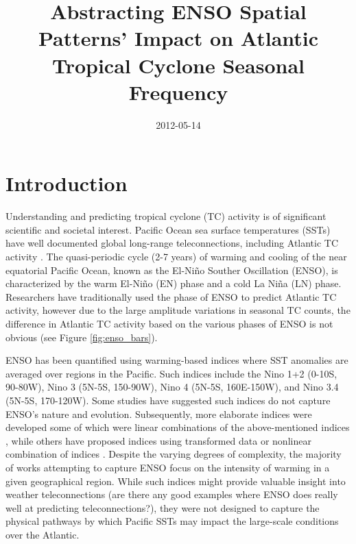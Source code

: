 \documentclass[]{article}
\title{Abstracting ENSO Spatial Patterns' Impact on Atlantic Tropical Cyclone Seasonal Frequency}
\author{  }
\date{2012-05-14}
\begin{document}
\ifpdf
{}
\else
{}
\fi

\maketitle


\begin{abstract}
\end{abstract}

\section{Introduction}
Understanding and predicting tropical cyclone (TC) activity is of significant scientific and societal interest. Pacific Ocean sea surface temperatures (SSTs) have well documented global long-range teleconnections, including Atlantic TC activity \cite{gray1984a, bove1998,elsner2001b, emanuel2008, klotzbach2011nino}. The quasi-periodic cycle (2-7 years) of warming and cooling of the near equatorial Pacific Ocean, known as the El-Ni\~no Souther Oscillation (ENSO), is characterized by the warm El-Ni\~no (EN) phase and a cold La Ni\~na (LN) phase. Researchers have traditionally used the phase of ENSO to predict Atlantic TC activity, however due to the large amplitude variations in seasonal TC counts, the difference in Atlantic TC activity based on the various phases of ENSO is not obvious (see Figure \ref{fig:enso_bars}).

ENSO has been quantified using warming-based indices where SST anomalies are averaged over regions in the Pacific. Such indices include the Nino 1+2 (0-10S, 90-80W), Nino 3 (5N-5S, 150-90W), Nino 4 (5N-5S, 160E-150W), and Nino 3.4 (5N-5S, 170-120W). Some studies have suggested such indices do not capture ENSO's nature and evolution. Subsequently, more elaborate indices were developed some of which were linear combinations of the above-mentioned indices \cite{trenberth2001}, while others have proposed indices using transformed data or nonlinear combination of indices \cite{ren2011}. Despite the varying degrees of complexity, the majority of works attempting to capture ENSO focus on the intensity of warming in a given geographical region. While such indices might provide valuable insight into weather teleconnections (are there any good examples where ENSO does really well at predicting teleconnections?), they were not designed to capture the physical pathways by which Pacific SSTs may impact the large-scale conditions over the Atlantic.
\end{document}
